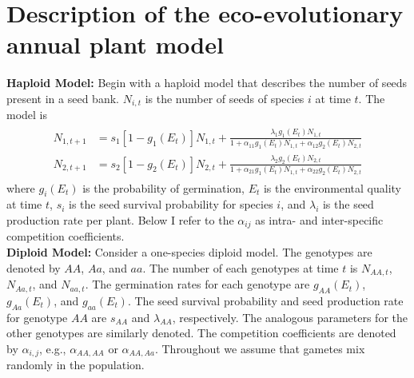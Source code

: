 \documentclass[11pt]{article}
\begin{document}
\section{Description of the eco-evolutionary annual plant model}\label{eco-evo}

\renewcommand{\theequation}{B-\arabic{equation}}
\renewcommand{\thetable}{B-\arabic{table}}
\renewcommand{\thefigure}{B-\arabic{figure}}

\noindent \textbf{Haploid Model:} Begin with a haploid model that describes the number of seeds present in a seed bank.  $N_{i,t}$ is the number of seeds of species $i$ at time $t$.  The model is
\begin{align}\begin{split}
N_{1,t+1} &= s_1 [1-g_1(E_t)]N_{1,t}+\frac{\lambda_1g_1(E_t)N_{1,t}}{1+ \alpha_{11}g_1(E_t)N_{1,t} + \alpha_{12}g_2(E_t)N_{2,t}}\\
N_{2,t+1} &= s_2 [1-g_2(E_t)]N_{2,t}+\frac{\lambda_2g_2(E_t)N_{2,t}}{1+ \alpha_{21}g_1(E_t)N_{1,t} + \alpha_{22}g_2(E_t)N_{2,t}}
\end{split}\end{align}
where $g_{i}(E_t)$ is the probability of germination, $E_t$ is the environmental quality at time $t$, $s_i$ is the seed survival probability for species $i$, and $\lambda_i$ is the seed production rate per plant.  Below I refer to the $\alpha_{ij}$ as intra- and inter-specific competition coefficients.  \\

\noindent \textbf{Diploid Model:} Consider a one-species diploid model.  The genotypes are denoted by $AA$, $Aa$, and $aa$.   The number of each genotypes at time $t$ is $N_{AA,t}$, $N_{Aa,t}$, and $N_{aa,t}$.  The germination rates for each genotype are $g_{AA}(E_t)$, $g_{Aa}(E_t)$, and $g_{aa}(E_t)$.  The seed survival probability and seed production rate for genotype $AA$ are $s_{AA}$ and $\lambda_{AA}$, respectively.  The analogous parameters for the other genotypes are similarly denoted.  The competition coefficients are denoted by $\alpha_{i,j}$, e.g., $\alpha_{AA,AA}$ or $\alpha_{AA,Aa}$.  Throughout we assume that gametes mix randomly in the population.  
\end{document}

